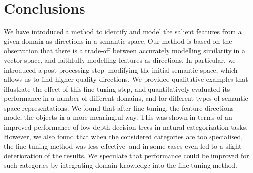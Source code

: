 \section{Conclusions}
We have introduced a method to identify and model the salient features from a given domain as directions in a semantic space. Our method is based on the observation that there is a trade-off between accurately modelling similarity in a vector space, and faithfully modelling features as directions. In particular, we introduced a post-processing step, modifying the initial semantic space, which allows us to find higher-quality directions. We provided qualitative examples that illustrate the effect of this fine-tuning step, and quantitatively evaluated its performance in a number of different domains, and for different types of semantic space representations. We found that after fine-tuning, the feature directions model the objects in a more meaningful way. This was shown in terms of an improved performance of low-depth decision trees in natural categorization tasks. However, we also found that when the considered categories are too specialized, the fine-tuning method was less effective, and in some cases even led to a slight deterioration of the results. We speculate that performance could be improved for such categories by integrating domain knowledge into the fine-tuning method. 








